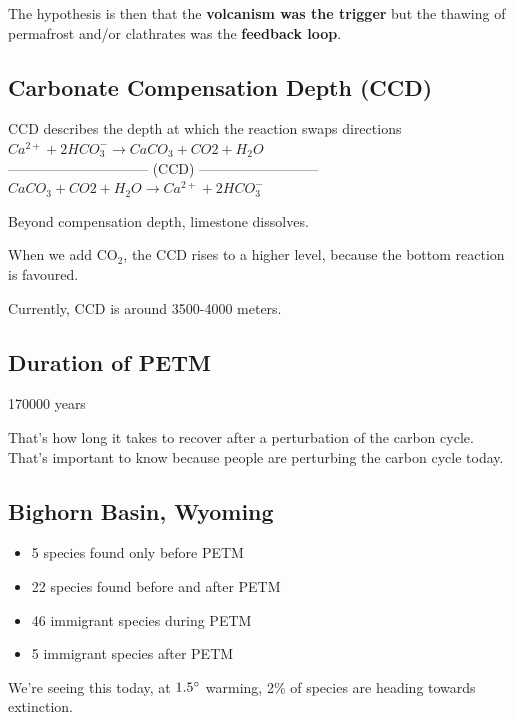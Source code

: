 The hypothesis is then that the \textbf{volcanism was the trigger} but the
thawing of permafrost and/or clathrates was the \textbf{feedback loop}.

\subsection{Carbonate Compensation Depth (CCD)}

CCD describes the depth at which the reaction swaps directions
$Ca^{2+} + 2 HCO_3^{-} \rightarrow CaCO_3 + CO2 + H_2O$\\
------------------------------ (CCD) --------------------------\\
$CaCO_3 + CO2 + H_2O \rightarrow Ca^{2+} + 2 HCO_3^{-}$

Beyond compensation depth, limestone dissolves.

When we add CO$_2$, the CCD rises to a higher level, because the bottom
reaction is favoured.

Currently, CCD is around 3500-4000 meters.

\subsection{Duration of PETM}

170000 years

That's how long it takes to recover after a perturbation of the carbon cycle.
That's important to know because people are perturbing the carbon cycle today.

\subsection{Bighorn Basin, Wyoming}
\begin{itemize}
    \item 5 species found only before PETM
    \item 22 species found before and after PETM
    \item 46 immigrant species during PETM
    \item 5 immigrant species after PETM
\end{itemize}

We're seeing this today, at $1.5 \degree$ warming, 2\% of species are heading
towards extinction.

